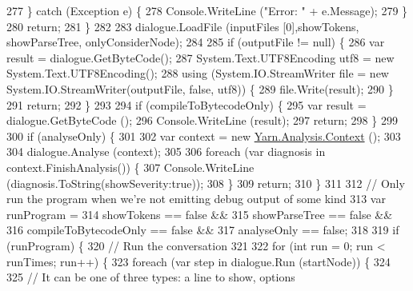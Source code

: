 \begin{DoxyCode}
277                 \} \textcolor{keywordflow}{catch} (Exception e) \{
278                     Console.WriteLine (\textcolor{stringliteral}{"Error: "} + e.Message);
279                 \}
280                 \textcolor{keywordflow}{return};
281             \}
282 
283             dialogue.LoadFile (inputFiles [0],showTokens, showParseTree, onlyConsiderNode);
284 
285             \textcolor{keywordflow}{if} (outputFile != null) \{
286                 var result = dialogue.GetByteCode();
287                 System.Text.UTF8Encoding utf8 = \textcolor{keyword}{new} System.Text.UTF8Encoding();
288                 \textcolor{keyword}{using} (System.IO.StreamWriter file = \textcolor{keyword}{new} System.IO.StreamWriter(outputFile, \textcolor{keyword}{false}, utf8)) \{
289                     file.Write(result);
290                 \}
291                 \textcolor{keywordflow}{return};
292             \}
293 
294             \textcolor{keywordflow}{if} (compileToBytecodeOnly) \{
295                 var result = dialogue.GetByteCode ();
296                 Console.WriteLine (result);
297                 \textcolor{keywordflow}{return};
298             \}
299 
300             \textcolor{keywordflow}{if} (analyseOnly) \{
301 
302                 var context = \textcolor{keyword}{new} \hyperlink{a00031}{Yarn.Analysis.Context} ();
303 
304                 dialogue.Analyse (context);
305 
306                 \textcolor{keywordflow}{foreach} (var diagnosis \textcolor{keywordflow}{in} context.FinishAnalysis()) \{
307                     Console.WriteLine (diagnosis.ToString(showSeverity:\textcolor{keyword}{true}));
308                 \}
309                 \textcolor{keywordflow}{return};
310             \}
311 
312             \textcolor{comment}{// Only run the program when we're not emitting debug output of some kind}
313             var runProgram =
314                 showTokens == \textcolor{keyword}{false} &&
315                 showParseTree == \textcolor{keyword}{false} &&
316                 compileToBytecodeOnly == \textcolor{keyword}{false} &&
317                 analyseOnly == \textcolor{keyword}{false};
318 
319             \textcolor{keywordflow}{if} (runProgram) \{
320                 \textcolor{comment}{// Run the conversation}
321 
322                 \textcolor{keywordflow}{for} (\textcolor{keywordtype}{int} run = 0; run < runTimes; run++) \{
323                     \textcolor{keywordflow}{foreach} (var step \textcolor{keywordflow}{in} dialogue.Run (startNode)) \{
324 
325                         \textcolor{comment}{// It can be one of three types: a line to show, options}

\end{DoxyCode}
